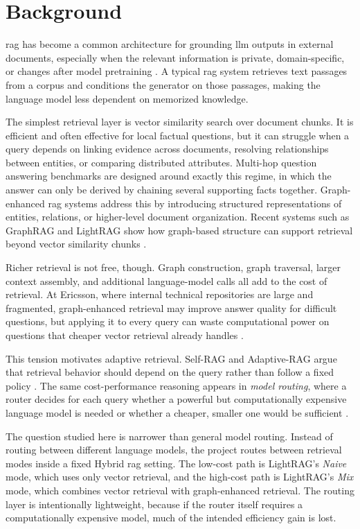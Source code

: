 \documentclass[english, bibtex]{kththesis}               %
\numberwithin{listing}{chapter}
\begin{document}
\section{Background}
\label{sec:background}

\Gls{rag} has become a common architecture for grounding \gls{llm} outputs in external documents, especially when the relevant information is private, domain-specific, or changes after model pretraining \cite{gao2023ragsurvey}. A typical \gls{rag} system retrieves text passages from a corpus and conditions the generator on those passages, making the language model less dependent on memorized knowledge.

The simplest retrieval layer is vector similarity search over document chunks. It is efficient and often effective for local factual questions, but it can struggle when a query depends on linking evidence across documents, resolving relationships between entities, or comparing distributed attributes. Multi-hop question answering benchmarks are designed around exactly this regime, in which the answer can only be derived by chaining several supporting facts together. Graph-enhanced \gls{rag} systems address this by introducing structured representations of entities, relations, or higher-level document organization. Recent systems such as GraphRAG and LightRAG show how graph-based structure can support retrieval beyond vector similarity chunks \cite{edge2024graphrag,lightrag2024}.

Richer retrieval is not free, though. Graph construction, graph traversal, larger context assembly, and additional language-model calls all add to the cost of retrieval. At Ericsson, where internal technical repositories are large and fragmented, graph-enhanced retrieval may improve answer quality for difficult questions, but applying it to every query can waste computational power on questions that cheaper vector retrieval already handles \cite{jeong2024adaptiverag,hu2024routerbench}.

This tension motivates adaptive retrieval. Self-RAG and Adaptive-RAG argue that retrieval behavior should depend on the query rather than follow a fixed policy \cite{asai2023selfrag,jeong2024adaptiverag}. The same cost-performance reasoning appears in \emph{model routing}, where a router decides for each query whether a powerful but computationally expensive language model is needed or whether a cheaper, smaller one would be sufficient \cite{hu2024routerbench}.

The question studied here is narrower than general model routing. Instead of routing between different language models, the project routes between retrieval modes inside a fixed Hybrid \gls{rag} setting. The low-cost path is LightRAG's \emph{Naive} mode, which uses only vector retrieval, and the high-cost path is LightRAG's \emph{Mix} mode, which combines vector retrieval with graph-enhanced retrieval. The routing layer is intentionally lightweight, because if the router itself requires a computationally expensive model, much of the intended efficiency gain is lost.
\end{document}
